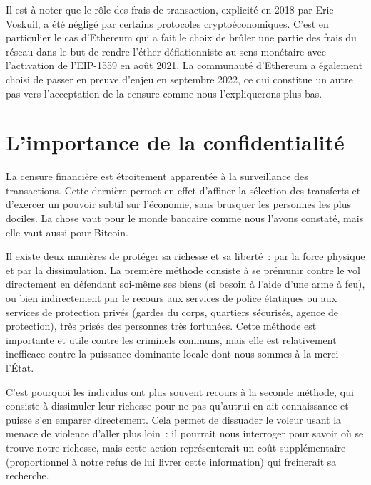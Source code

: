 Il est à noter que le rôle des frais de transaction, explicité en 2018 par Eric Voskuil, a été négligé par certains protocoles cryptoéconomiques. C'est en particulier le cas d'Ethereum qui a fait le choix de brûler une partie des frais du réseau dans le but de rendre l'éther déflationniste au sens monétaire avec l'activation de l'EIP-1559 en août 2021. La communauté d'Ethereum a également choisi de passer en preuve d'enjeu en septembre 2022, ce qui constitue un autre pas vers l'acceptation de la censure comme nous l'expliquerons plus bas.

\section*{L'importance de la confidentialité}

La censure financière est étroitement apparentée à la surveillance des transactions. Cette dernière permet en effet d'affiner la sélection des transferts et d'exercer un pouvoir subtil sur l'économie, sans brusquer les personnes les plus dociles. La chose vaut pour le monde bancaire comme nous l'avons constaté, mais elle vaut aussi pour Bitcoin.


Il existe deux manières de protéger sa richesse et sa liberté~: par la force physique et par la dissimulation. La première méthode consiste à se prémunir contre le vol directement en défendant soi-même ses biens (si besoin à l'aide d'une arme à feu), ou bien indirectement par le recours aux services de police étatiques ou aux services de protection privés (gardes du corps, quartiers sécurisés, agence de protection), très prisés des personnes très fortunées. Cette méthode est importante et utile contre les criminels communs, mais elle est relativement inefficace contre la puissance dominante locale dont nous sommes à la merci -- l'État.

C'est pourquoi les individus ont plus souvent recours à la seconde méthode, qui consiste à dissimuler leur richesse pour ne pas qu'autrui en ait connaissance et puisse s'en emparer directement. Cela permet de dissuader le voleur usant la menace de violence d'aller plus loin~: il pourrait nous interroger pour savoir où se trouve notre richesse, mais cette action représenterait un coût supplémentaire (proportionnel à notre refus de lui livrer cette information) qui freinerait sa recherche.

